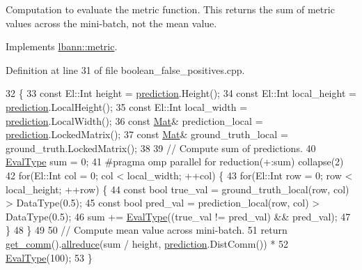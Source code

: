 Computation to evaluate the metric function. This returns the sum of metric values across the mini-\/batch, not the mean value. 

Implements \hyperlink{classlbann_1_1metric_aab79147ff480675db2e01d7a889a4296}{lbann\+::metric}.



Definition at line 31 of file boolean\+\_\+false\+\_\+positives.\+cpp.


\begin{DoxyCode}
32                                                                 \{
33   \textcolor{keyword}{const} El::Int height = \hyperlink{base_8hpp_a2781a159088df64ed7d47cc91c4dc0a8ac41b9ec75e920b610e8907e066074b30}{prediction}.Height();
34   \textcolor{keyword}{const} El::Int local\_height = \hyperlink{base_8hpp_a2781a159088df64ed7d47cc91c4dc0a8ac41b9ec75e920b610e8907e066074b30}{prediction}.LocalHeight();
35   \textcolor{keyword}{const} El::Int local\_width = \hyperlink{base_8hpp_a2781a159088df64ed7d47cc91c4dc0a8ac41b9ec75e920b610e8907e066074b30}{prediction}.LocalWidth();
36   \textcolor{keyword}{const} \hyperlink{base_8hpp_a68f11fdc31b62516cb310831bbe54d73}{Mat}& prediction\_local = \hyperlink{base_8hpp_a2781a159088df64ed7d47cc91c4dc0a8ac41b9ec75e920b610e8907e066074b30}{prediction}.LockedMatrix();
37   \textcolor{keyword}{const} \hyperlink{base_8hpp_a68f11fdc31b62516cb310831bbe54d73}{Mat}& ground\_truth\_local = ground\_truth.LockedMatrix();
38 
39   \textcolor{comment}{// Compute sum of predictions.}
40   \hyperlink{base_8hpp_a3266f5ac18504bbadea983c109566867}{EvalType} sum = 0;
41 \textcolor{preprocessor}{  #pragma omp parallel for reduction(+:sum) collapse(2)}
42   \textcolor{keywordflow}{for}(El::Int col = 0; col < local\_width; ++col) \{
43     \textcolor{keywordflow}{for}(El::Int row = 0; row < local\_height; ++row) \{
44       \textcolor{keyword}{const} \textcolor{keywordtype}{bool} true\_val = ground\_truth\_local(row, col) > DataType(0.5);
45       \textcolor{keyword}{const} \textcolor{keywordtype}{bool} pred\_val = prediction\_local(row, col) > DataType(0.5);
46       sum += \hyperlink{base_8hpp_a3266f5ac18504bbadea983c109566867}{EvalType}((true\_val != pred\_val) && pred\_val);
47     \}
48   \}
49   
50   \textcolor{comment}{// Compute mean value across mini-batch.}
51   \textcolor{keywordflow}{return} \hyperlink{classlbann_1_1metric_a464120720df6bfdf91bffe353e562964}{get\_comm}().\hyperlink{classlbann_1_1lbann__comm_af5631e5f0f54e4df4958eba9df2599ef}{allreduce}(sum / height, \hyperlink{base_8hpp_a2781a159088df64ed7d47cc91c4dc0a8ac41b9ec75e920b610e8907e066074b30}{prediction}.DistComm()) *
52     \hyperlink{base_8hpp_a3266f5ac18504bbadea983c109566867}{EvalType}(100);
53 \}
\end{DoxyCode}
